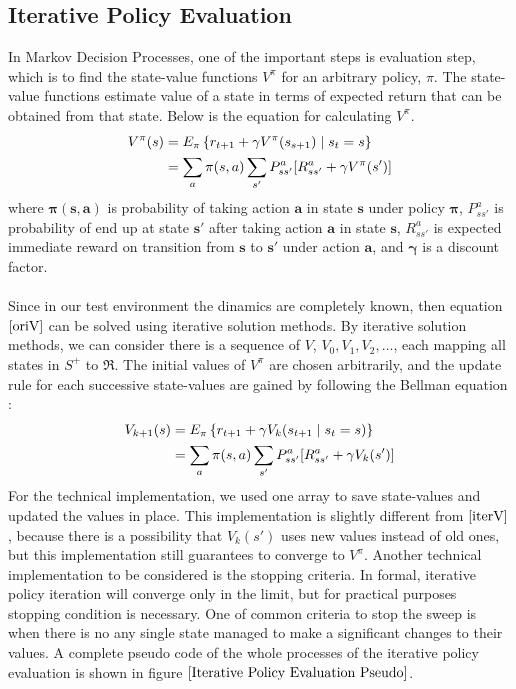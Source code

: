 \documentclass[paper=a4, fontsize=11pt]{scrartcl}
\numberwithin{equation}{section}		%
\numberwithin{figure}{section}			%
\numberwithin{table}{section}				%
\begin{document}
\subsection{Iterative Policy Evaluation}
\label{PEval}
In Markov Decision Processes, one of the important steps is evaluation step, which is to find the state-value functions $V^\pi$ for an arbitrary policy, $\pi$. The state-value functions estimate value of a state in terms of expected return that can be obtained from that state. Below is the equation for calculating $V^\pi$.
\begin{align}
V^\pi(s)&=E_\pi\left\lbrace r_{t+1}+\gamma V^\pi(s_{s+1})\mid s_t=s \right\rbrace\notag\\
&=\sum_{a}\pi(s,a)\sum_{s'}P_{ss'}^a[R_{ss'}^a+\gamma V^\pi(s')] \label{oriV}
\end{align}
where $\mathbf{\pi(s,a)}$ is probability of taking action $\mathbf{a}$ in state $\mathbf{s}$ under policy $\mathbf{\pi}$, $P_{ss'}^a$ is probability of end up at state $\mathbf{s'}$ after taking action $\mathbf{a}$ in state $\mathbf{s}$, $R_{ss'}^a$ is expected immediate reward on transition from $\mathbf{s}$ to $\mathbf{s'}$ under action $\mathbf{a}$, and $\mathbf{\gamma}$ is a discount factor.\\
\\
Since in our test environment the dinamics are completely known, then  equation $\eqref{oriV}$ can be solved using iterative solution methods. By iterative solution methods, we can consider there is a sequence of $V$, $V_0, V_1, V_2, \dots$, each mapping all states in $S^+$ to $\Re$. The initial values of $V^\pi$ are chosen arbitrarily, and the update rule for each successive state-values are gained by following the Bellman equation :
\begin{align}
V_{k+1}(s) &= E_\pi\left\lbrace r_{t+1}+\gamma V_{k}(s_{t+1}\mid s_t=s) \right\rbrace\notag\\
&=\sum_{a}\pi(s,a)\sum_{s'}P_{ss'}^a [R_{ss'}^a+\gamma V_k(s')] \label{iterV}
\end{align}
For the technical implementation, we used one array to save state-values and updated the values in place. This implementation is slightly different from $\eqref{iterV}$, because there is a possibility that $V_k(s')$ uses new values  instead of old ones, but this implementation still guarantees to converge to $V^\pi$. Another technical implementation to be considered is the stopping criteria. In formal, iterative policy iteration will converge only in the limit, but for practical purposes stopping condition is necessary. One of common criteria to stop the sweep is when there is no any single state managed to make a significant changes to their values. A complete pseudo code of the whole processes of the iterative policy evaluation is shown in figure $\ref{Iterative Policy Evaluation Pseudo}$.
\end{document}
